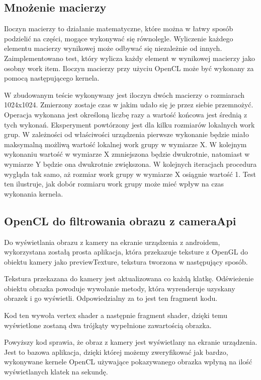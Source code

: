 \subsection[Mnożenie macierzy]{Mnożenie macierzy}
Iloczyn macierzy to działanie matematyczne, które można w łatwy sposób podzielić na części, mogące wykonywać się równolegle. Wyliczenie każdego elementu macierzy wynikowej może odbywać się niezależnie od innych. Zaimplementowano test, który wylicza każdy element w wynikowej macierzy jako osobny work item. Iloczyn macierzy przy użyciu OpenCL może być wykonany za pomocą następującego kernela.

W zbudowanym teście wykonywany jest iloczyn dwóch macierzy o rozmiarach 1024x1024. Zmierzony zostaje czas w jakim udało się je przez siebie przemnożyć. Operacja wykonana jest określoną liczbę razy a wartość końcowa jest średnią z tych wykonań. Eksperyment powtórzony jest dla kilku rozmiarów lokalnych work grup. W zależności od właściwości urządzenia pierwsze wykonanie będzie miało maksymalną możliwą wartość lokalnej work grupy w wymiarze X. W kolejnym wykonaniu wartość w wymiarze X zmniejszona będzie dwukrotnie, natomiast w wymiarze Y będzie ona dwukrotnie zwiększona. W kolejnych iteracjach procedura wygląda tak samo, aż rozmiar work grupy w wymiarze X osiągnie wartość 1. Test ten ilustruje, jak dobór rozmiaru work grupy może mieć wpływ na czas wykonania kernela.
\subsection[OpenCL do filtrowania obrazu z cameraApi]{OpenCL do filtrowania obrazu z cameraApi}
Do wyświetlania obrazu z kamery na ekranie urządzenia z androidem, wykorzystana zostałą prosta aplikacja, która przekazuje teksture z OpenGL do obiektu kamery jako previewTexture, tekstura tworzona w następujący sposób.

 Tekstura przekazana do kamery jest aktualizowana co każdą klatkę. Odświeżenie obiektu obrazka powoduje wywołanie metody, która wyrenderuje uzyskany obrazek i go wyświetli. Odpowiedzialny za to jest ten fragment kodu.
 

Kod ten wywoła vertex shader a następnie fragment shader, dzięki temu wyświetlone zostaną dwa trójkąty wypełnione zawartością obrazka.

Powyższy kod sprawia, że obraz z kamery jest wyświetlany na ekranie urządzenia. Jest to bazowa aplikacja, dzięki której możemy zweryfikować jak bardzo, wykonywane kernele OpenCL używające pokazywanego obrazka wpłyną na ilość wyświetlanych klatek na sekundę.
